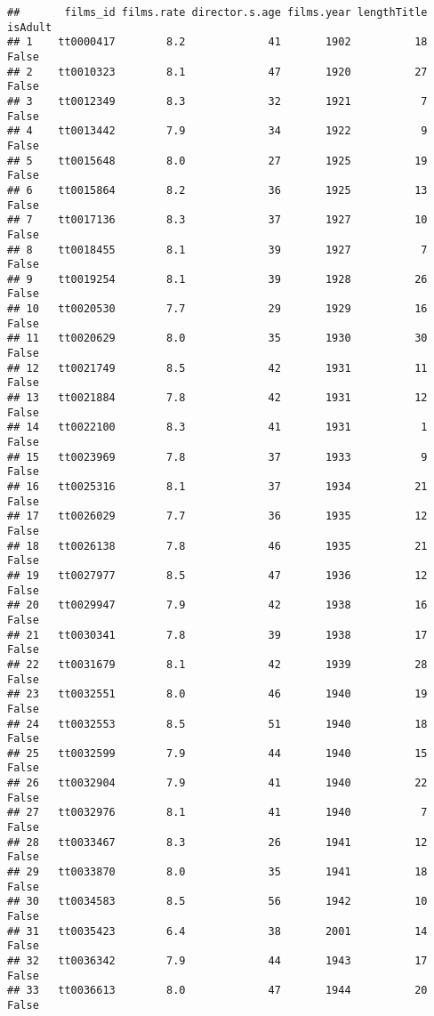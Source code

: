 \documentclass[
]{article}
\begin{document}
\begin{verbatim}
##       films_id films.rate director.s.age films.year lengthTitle isAdult
## 1    tt0000417        8.2             41       1902          18   False
## 2    tt0010323        8.1             47       1920          27   False
## 3    tt0012349        8.3             32       1921           7   False
## 4    tt0013442        7.9             34       1922           9   False
## 5    tt0015648        8.0             27       1925          19   False
## 6    tt0015864        8.2             36       1925          13   False
## 7    tt0017136        8.3             37       1927          10   False
## 8    tt0018455        8.1             39       1927           7   False
## 9    tt0019254        8.1             39       1928          26   False
## 10   tt0020530        7.7             29       1929          16   False
## 11   tt0020629        8.0             35       1930          30   False
## 12   tt0021749        8.5             42       1931          11   False
## 13   tt0021884        7.8             42       1931          12   False
## 14   tt0022100        8.3             41       1931           1   False
## 15   tt0023969        7.8             37       1933           9   False
## 16   tt0025316        8.1             37       1934          21   False
## 17   tt0026029        7.7             36       1935          12   False
## 18   tt0026138        7.8             46       1935          21   False
## 19   tt0027977        8.5             47       1936          12   False
## 20   tt0029947        7.9             42       1938          16   False
## 21   tt0030341        7.8             39       1938          17   False
## 22   tt0031679        8.1             42       1939          28   False
## 23   tt0032551        8.0             46       1940          19   False
## 24   tt0032553        8.5             51       1940          18   False
## 25   tt0032599        7.9             44       1940          15   False
## 26   tt0032904        7.9             41       1940          22   False
## 27   tt0032976        8.1             41       1940           7   False
## 28   tt0033467        8.3             26       1941          12   False
## 29   tt0033870        8.0             35       1941          18   False
## 30   tt0034583        8.5             56       1942          10   False
## 31   tt0035423        6.4             38       2001          14   False
## 32   tt0036342        7.9             44       1943          17   False
## 33   tt0036613        8.0             47       1944          20   False

\end{verbatim}
\end{document}
